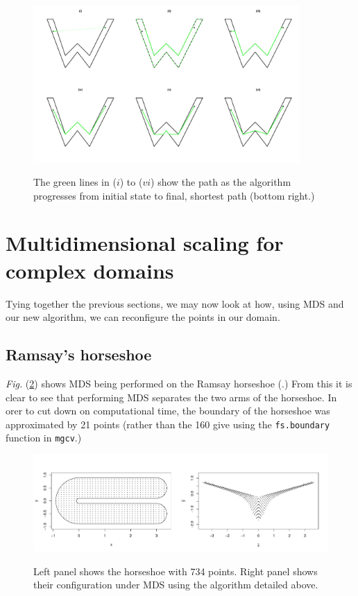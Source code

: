 \documentclass[a4paper,10pt]{article}
\newcommand{\Fig}[1]{\emph{Fig.} (\ref{#1})}
\begin{document}
\begin{figure}
\centering
\includegraphics[trim=0in 0.5in 0in 0.25in, width=4in]{figs/wdia.pdf} \\
\caption{The green lines in ($i$) to ($vi$) show the path as the algorithm progresses from initial state to final, shortest path (bottom right.) }
\label{wdia}
\end{figure}


\section{Multidimensional scaling for complex domains}

Tying together the previous sections, we may now look at how, using MDS and our new algorithm, we can reconfigure the points in our domain.

\subsection{Ramsay's horseshoe}

\Fig{ramsay-mds} shows MDS being performed on the Ramsay horseshoe (\cite{ramsay}.) From this it is clear to see that performing MDS separates the two arms of the horseshoe. In orer to cut down on computational time, the boundary of the horseshoe was approximated by 21 points (rather than the 160 give using the \texttt{fs.boundary} function in \texttt{mgcv}.)

\begin{figure}
\centering
\includegraphics[trim=0in 0.5in 0in 0.25in, width=5.5in]{figs/ramsay-mds.pdf} \\
\caption{Left panel shows the horseshoe with 734 points. Right panel shows their configuration under MDS using the algorithm detailed above.}
\label{ramsay-mds}
\end{figure}
\end{document}
